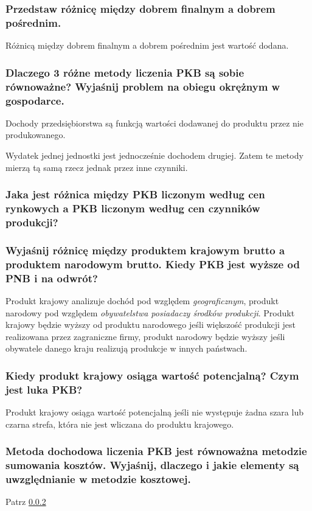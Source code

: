 \documentclass[a4paper,12pt]{article}
\begin{document}
\subsubsection{Przedstaw różnicę między dobrem finalnym a dobrem pośrednim.}

Różnicą między dobrem finalnym a dobrem pośrednim jest wartość dodana.

\subsubsection{Dlaczego 3 różne metody liczenia PKB są sobie równoważne? Wyjaśnij problem na obiegu okrężnym w gospodarce.}\label{metodyPKB-równe}

Dochody przedsiębiorstwa są funkcją wartości dodawanej do produktu przez nie produkowanego.

Wydatek jednej jednostki jest jednocześnie dochodem drugiej.
Zatem te metody mierzą tą samą rzecz jednak przez inne czynniki.

\subsubsection{Jaka jest różnica między PKB liczonym według cen rynkowych a PKB liczonym według cen czynników produkcji?}

\subsubsection{Wyjaśnij  różnicę między produktem krajowym brutto a produktem narodowym brutto. Kiedy PKB jest wyższe od PNB i na odwrót?}

Produkt krajowy analizuje dochód pod względem \emph{geograficznym},  produkt narodowy pod względem \emph{obywatelstwa posiadaczy środków produkcji}. Produkt krajowy będzie wyższy od produktu narodowego jeśli większość produkcji jest realizowana przez zagraniczne firmy, produkt narodowy będzie wyższy jeśli obywatele danego kraju realizują produkcje w innych państwach.

\subsubsection{Kiedy produkt krajowy osiąga wartość potencjalną? Czym jest luka PKB?}

Produkt krajowy osiąga wartość potencjalną jeśli nie występuje żadna szara lub czarna strefa, która nie jest wliczana do produktu krajowego.

\subsubsection{Metoda dochodowa liczenia PKB jest równoważna metodzie sumowania kosztów. Wyjaśnij, dlaczego i jakie elementy są uwzględnianie w metodzie kosztowej.
}
Patrz \ref{metodyPKB-równe}
\end{document}
